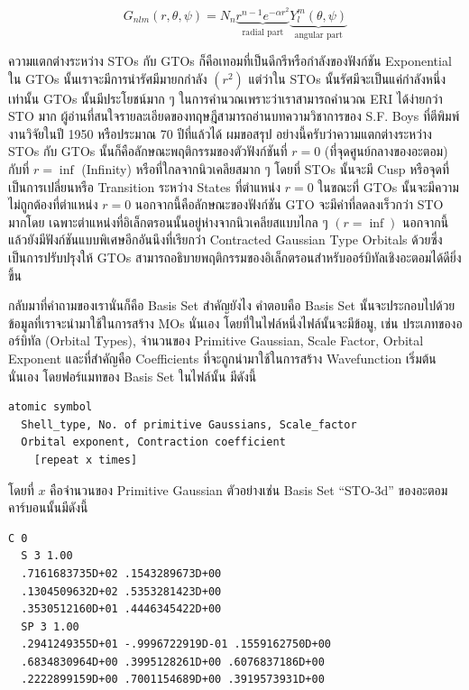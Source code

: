 \begin{equation}
  \label{eq:gto}
  G_{nlm} (r, \theta , \psi )
  =
  N_n
  \underbrace
  {
    r^{n-1} e^{-\alpha r^2}
  }_
  {
    \text{radial part}
  }
  \underbrace
  {
    Y^m_l (\theta, \psi)
  }_
  {
  \text{angular part}
  }
\end{equation}

ความแตกต่างระหว่าง STOs กับ GTOs ก็คือเทอมที่เป็นดีกรีหรือกำลังของฟังก์ชัน Exponential ใน GTOs นั้นเราจะมีการนำรัศมีมายกกำลัง $(r^{2})$
แต่ว่าใน STOs นั้นรัศมีจะเป็นแค่กำลังหนึ่งเท่านั้น GTOs นั้นมีประโยชน์มาก ๆ ในการคำนวณเพราะว่าเราสามารถคำนวณ ERI ได้ง่ายกว่า STO มาก
ผู้อ่านที่สนใจรายละเอียดของทฤษฎีสามารถอ่านบทความวิชาการของ S.F. Boys ที่ตีพิมพ์งานวิจัยในปี 1950 หรือประมาณ 70 ปีที่แล้วได้ ผมขอสรุป%
อย่างนี้ครับว่าความแตกต่างระหว่าง STOs กับ GTOs นั้นก็คือลักษณะพฤติกรรมของตัวฟังก์ชันที่ $r = 0$ (ที่จุดศูนย์กลางของอะตอม) กับที่ $r = \inf$
(Infinity) หรือที่ใกลจากนิวเคลียสมาก ๆ โดยที่ STOs นั้นจะมี Cusp หรือจุดที่เป็นการเปลี่ยนหรือ Transition ระหว่าง States ที่ตำแหน่ง
$r = 0$ ในขณะที่ GTOs นั้นจะมีความไม่ถูกต้องที่ตำแหน่ง $r = 0$ นอกจากนี้คือลักษณะของฟังก์ชัน GTO จะมีค่าที่ลดลงเร็วกว่า STO มากโดย%
เฉพาะตำแหน่งที่อิเล็กตรอนนั้นอยู่ห่างจากนิวเคลียสแบบไกล ๆ $(r = \inf)$ นอกจากนี้แล้วยังมีฟังก์ชันแบบพิเศษอีกอันนึงที่เรียกว่า Contracted
Gaussian Type Orbitals ด้วยซึ่งเป็นการปรับปรุงให้ GTOs สามารถอธิบายพฤติกรรมของอิเล็กตรอนสำหรับออร์บิทัลเชิงอะตอมได้ดียิ่งขึ้น

กลับมาที่คำถามของเรานั่นก็คือ Basis Set สำคัญยังไง คำตอบคือ Basis Set นั้นจะประกอบไปด้วยข้อมูลที่เราจะนำมาใช้ในการสร้าง MOs นั่นเอง
โดยที่ในไฟล์หนึ่งไฟล์นั้นจะมีข้อมู, เช่น ประเภทของออร์บิทัล (Orbital Types), จำนวนของ Primitive Gaussian, Scale Factor, Orbital
Exponent และที่สำคัญคือ Coefficients ที่จะถูกนำมาใช้ในการสร้าง Wavefunction เริ่มต้นนั่นเอง โดยฟอร์แมทของ Basis Set ในไฟล์นั้น%
มีดังนี้

\begin{Verbatim}[frame=single]
  atomic symbol
  Shell_type, No. of primitive Gaussians, Scale_factor
  Orbital exponent, Contraction coefficient
    [repeat x times]
\end{Verbatim}

โดยที่ $x$ คือจำนวนของ Primitive Gaussian ตัวอย่างเช่น Basis Set \enquote{STO-3d} ของอะตอมคาร์บอนนั้นมีดังนี้

\begin{Verbatim}[frame=single]
  C 0
  S 3 1.00
  .7161683735D+02 .1543289673D+00
  .1304509632D+02 .5353281423D+00
  .3530512160D+01 .4446345422D+00
  SP 3 1.00
  .2941249355D+01 -.9996722919D-01 .1559162750D+00
  .6834830964D+00 .3995128261D+00 .6076837186D+00
  .2222899159D+00 .7001154689D+00 .3919573931D+00
\end{Verbatim}

